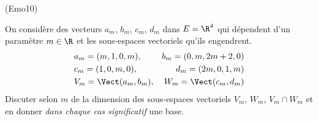 \begin{tiny}(Emo10)\end{tiny} On considère des vecteurs $a_m$, $b_m$, $c_m$, $d_m$ dans $E=\R^{4}$ qui dépendent d'un paramètre $m\in \R$ et les sous-espaces vectoriels qu'ils engendrent.
\begin{align*}
&a_m = (m,1,0,m), &b_m = (0,m,2m+2,0)\\
&c_m = (1,0,m,0), &d_m = (2m,0,1,m)\\
&V_m = \Vect(a_m,b_m), &W_m=\Vect(c_m,d_m)
\end{align*}
Discuter selon $m$ de la dimension des sous-espaces vectoriels  $V_m$, $W_m$, $V_m \cap W_m$ et en donner \emph{dans chaque cas significatif} une base.